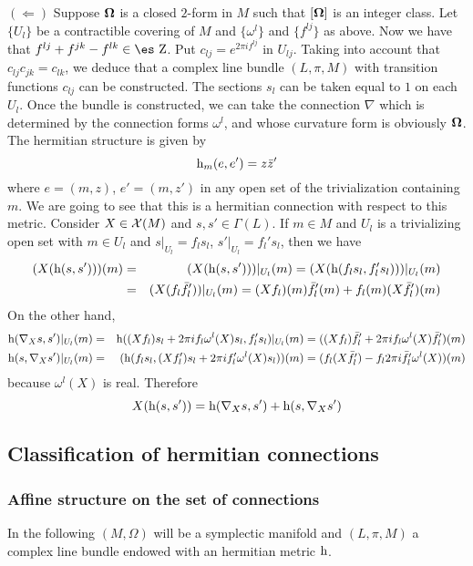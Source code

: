 \documentclass[12pt]{article}
\theoremstyle{plain}
\def\beann{\begin{eqnarray*}}
\def\eeann{\end{eqnarray*}}
\def\qed{\ifvmode\removelastskip\fi
{\unskip\nobreak\hfil\penalty50\hbox{}\nobreak\hfil
\hbox{\vrule height1.2ex width1.2ex}\parfillskip=0pt
\finalhyphendemerits=0 \par\smallskip}}
\def\h{{\rm h}}
\def\curv{{\bf \Omega}}
\def\Zahl{\mbox{\es Z}}
\begin{document}
\quad
$(\Longleftarrow)$ \quad
Suppose $\curv $ is a closed $2$-form in $M$ such that
$[\curv ]$ is an integer class.
Let $\{ U_l \}$ be a contractible covering of $M$
and  $\{ \omega^l  \}$ and $\{ f^{l j} \}$ as above.
Now we have that
$f^{l j} + f^{jk} - f^{l k} \in \Zahl$.
Put $c_{l j} = e^{2\pi i f^{l j}}$ in $U_{l j}$.
Taking into account that $c_{l j} c_{jk} = c_{l k}$,
we deduce that a complex line bundle
$(L,\pi ,M)$ with transition functions $c_{l j}$ can be constructed.
The sections $s_l$ can be taken equal to $1$ on each $U_l$.
Once the bundle is constructed, we can take the connection $\nabla$
which is determined by the connection forms
$\omega^l$, and whose curvature form is obviously $\curv $.
The hermitian structure is given by
$$
\h_m(e,e') = z \bar z'
$$
where $e = (m,z)$, $e' = (m,z')$
in any open set of the trivialization containing $m$.
We are going to see that this is
a hermitian connection with respect to this metric. Consider
$X \in {\cal X}(M)$ and $s,s' \in \Gamma (L)$. If
$m \in M$ and $U_l$ is a trivializing open set with $m \in U_l$ and
$s \vert_{U_l} = f_ls_l$, $s' \vert_{U_l} = f_l 's_l$, then we have
\beann
(X(\h (s,s')))(m)
&=&
(X(\h (s,s')))\vert_{U_l}(m)=
(X(\h (f_l s_l,f_l 's_l)))\vert_{U_l}(m)
\\
&=&
(X(f_l \bar f_l '))\vert_{U_l}(m)=
(Xf_l )(m) \bar f_l '(m) + f_l (m)(X \bar f_l ')(m)
\eeann
On the other hand,
\beann
\h (\nabla_X s,s')\vert_{U_l}(m)
&=&
\h ((Xf_l )s_l + 2 \pi i f_l\omega^l  (X)
 s_l ,f_l 's_l )\vert_{U_l}(m)=
((Xf_l )\bar f_l ' + 2 \pi i f_l\omega^l  (X) \bar f_l ')(m)
\\
\h (s,\nabla_Xs')\vert_{U_l}(m)
&=&
(\h (f_l s_l ,(Xf_l ')s_l+ 2 \pi i f_l '\omega^l(X) s_l))(m)=
(f_l (X \bar{f_l '}) -  f_l 2 \pi i \bar{f_l '}\omega^l  (X))(m)
\eeann
because $\omega^l  (X)$ is real. Therefore
$$
X(\h (s,s')) =
\h (\nabla_X s,s') + \h (s,\nabla_Xs')
$$
\qed



\subsection{Classification of hermitian connections}


\subsubsection{Affine structure on the set of connections}


In the following
$(M,\Omega)$ will be a symplectic manifold and
$(L,\pi , M)$ a complex line bundle
endowed with an hermitian metric $\h$.
\end{document}
